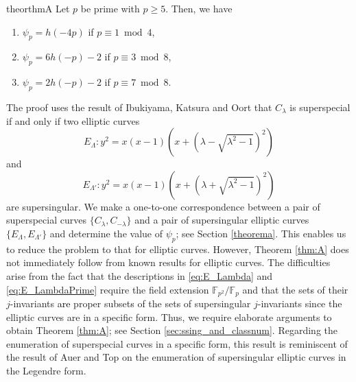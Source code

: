 \documentclass[a4paper, 11pt]{article}
\theoremstyle{plain}
\newtheorem*{thm*}{Theorem}
\newcommand{\?}{\textcolor{red}{??}}
\newcommand{\lm}{\lambda}
\newcommand{\Lm}{\Lambda}
\begin{document}
\begin{restatable}{theor}{thmA} \label{thm:A}
Let $p$ be prime with $p \ge 5$. Then, we have
   \begin{enumerate}
        \item[(1)] ${\psi}_{p}=h(-4p)$ if $p \equiv 1 \bmod 4$,
        \item[(2)] ${\psi}_{p}=6h(-p)-2$ if $p \equiv 3 \bmod 8$,
        \item[(3)] ${\psi}_{p}=2h(-p)-2$ if $p \equiv 7 \bmod 8$.
    \end{enumerate}
\end{restatable}   

 The proof uses the result of Ibukiyama, Katsura and Oort \cite[\S 1.2]{IKO02} that $C_{\lm}$ is superspecial if and only if two elliptic curves 
 \begin{equation}\label{eq:E_Lambda}
     E_{\Lm}:y^2=x(x-1)\left(x+(\lm - \sqrt{{\lm}^2-1})^2 \right)
 \end{equation}
 and 
\begin{equation}\label{eq:E_LambdaPrime}
 E_{{\Lm}'}:y^2=x(x-1)\left(x+(\lm +\sqrt{{\lm}^2-1})^2 \right)
 \end{equation}
 are supersingular. We make a one-to-one correspondence between a pair of superspecial curves $\{C_{\lm},C_{-\lm}\}$ and a pair of supersingular elliptic curves $\{ E_{\Lm},E_{{\Lm}'}\}$ and determine the value of ${\psi}_{p}$; see Section \ref{theorema}. This enables us to reduce the problem to that for elliptic curves.
However,
Theorem \ref{thm:A} does not immediately follow from known results for elliptic curves. The difficulties arise from the fact that the descriptions in \eqref{eq:E_Lambda} and \eqref{eq:E_LambdaPrime} require the field extension $\mathbb F_{p^2}/\mathbb F_{p}$ and that the set\textcolor{black}{s} of their $j$-invariants \textcolor{black}{are} proper subset\textcolor{black}{s} of the set\textcolor{black}{s} of supersingular $j$-invariants since the elliptic curves are in a specific form.
Thus, we require elaborate arguments to obtain Theorem \ref{thm:A}; see Section \ref{sec:ssing_and_classnum}. Regarding the enumeration of superspecial curves in a specific form, this result is reminiscent of the result of Auer and Top \cite[Proposition 3.2]{AT02} on the enumeration of supersingular elliptic curves in the Legendre form. 
\end{document}
